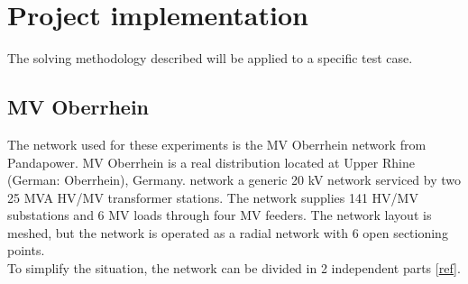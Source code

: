 \chapter{Project implementation}
\label{chapter5}
The solving methodology described will be applied to a specific test case.


\section{MV Oberrhein}
\label{sec:MVober}
The network used for these experiments is the MV Oberrhein network from Pandapower. MV Oberrhein is a real distribution located at Upper Rhine  (German:  Oberrhein),  Germany. network  a generic 20 kV network serviced by two 25 MVA HV/MV transformer stations. The network supplies 141 HV/MV substations and 6 MV loads through four MV feeders. The network layout is meshed, but the network is operated as a radial network with 6 open sectioning points. \\
To simplify the situation, the network can be divided in 2 independent parts [\href{https://kobra.uni-kassel.de/bitstream/handle/123456789/12005/kup_9783737608725.pdf?sequence=1&isAllowed=y}{ref}].

